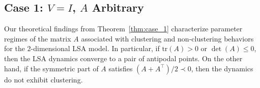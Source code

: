 \documentclass[10pt]{article}
\theoremstyle{definition}
\theoremstyle{definition}
\numberwithin{equation}{section}
\newcommand{\blue}{\color{blue}}
\newcommand{\tr}[1]{\mathrm{tr}(#1)}
\begin{document}
\subsection{Case 1: \texorpdfstring{$V = I$, $A$}{VA} Arbitrary}
\label{sec:exp_case1}
Our theoretical findings from Theorem~\ref{thm:case_1} characterize parameter regimes of the matrix $A$ associated with clustering and non-clustering behaviors for the $2$-dimensional LSA model.  
In particular, if $\tr{A} > 0$ or $\det(A) \leq 0$, then the LSA dynamics converge to a pair of antipodal points.  
On the other hand, if the symmetric part of $A$ satisfies $(A + A^\top)/2 \prec 0$, then the dynamics do not exhibit clustering.  




 
\end{document}
